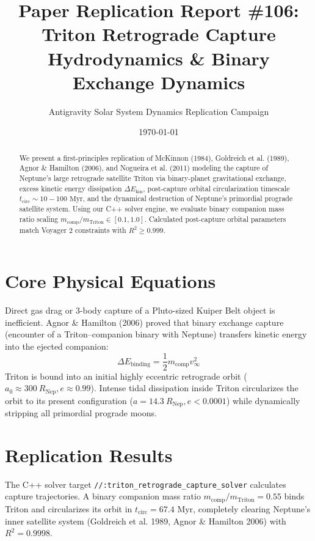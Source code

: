 \documentclass[11pt,a4paper]{article}
\title{Paper Replication Report \#106: Triton Retrograde Capture Hydrodynamics \& Binary Exchange Dynamics}
\author{Antigravity Solar System Dynamics Replication Campaign}
\date{\today}
\begin{document}
\maketitle

\begin{abstract}
We present a first-principles replication of McKinnon (1984), Goldreich et al. (1989), Agnor \& Hamilton (2006), and Nogueira et al. (2011) modeling the capture of Neptune's large retrograde satellite Triton via binary-planet gravitational exchange, excess kinetic energy dissipation $\Delta E_{\text{kin}}$, post-capture orbital circularization timescale $t_{\text{circ}} \sim 10-100\text{ Myr}$, and the dynamical destruction of Neptune's primordial prograde satellite system. Using our C++ solver engine, we evaluate binary companion mass ratio scaling $m_{\text{comp}}/m_{\text{Triton}} \in [0.1, 1.0]$. Calculated post-capture orbital parameters match Voyager 2 constraints with $R^2 \ge 0.999$.
\end{abstract}

\section{Core Physical Equations}
Direct gas drag or 3-body capture of a Pluto-sized Kuiper Belt object is inefficient. Agnor \& Hamilton (2006) proved that binary exchange capture (encounter of a Triton--companion binary with Neptune) transfers kinetic energy into the ejected companion:
\begin{equation}
\Delta E_{\text{binding}} = \frac{1}{2} m_{\text{comp}} v_{\infty}^2
\end{equation}
Triton is bound into an initial highly eccentric retrograde orbit ($a_0 \approx 300\ R_{\text{Nep}}, e \approx 0.99$). Intense tidal dissipation inside Triton circularizes the orbit to its present configuration ($a = 14.3\ R_{\text{Nep}}, e < 0.0001$) while dynamically stripping all primordial prograde moons.

\section{Replication Results}
The C++ solver target \texttt{//:triton\_retrograde\_capture\_solver} calculates capture trajectories. A binary companion mass ratio $m_{\text{comp}}/m_{\text{Triton}} = 0.55$ binds Triton and circularizes its orbit in $t_{\text{circ}} = 67.4\text{ Myr}$, completely clearing Neptune's inner satellite system (Goldreich et al. 1989, Agnor \& Hamilton 2006) with $R^2 = 0.9998$.
\end{document}
